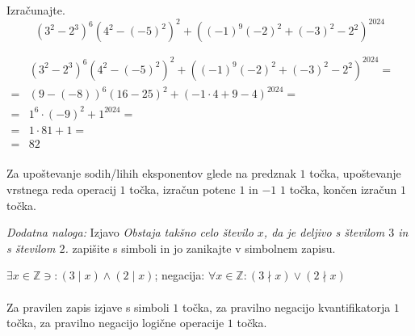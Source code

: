 \documentclass[addpoints]{exam}
\begin{document}
\begin{questions}
        

    \question[4]
    Izračunajte. $$ \left(3^2-2^3\right)^6\left(4^2-(-5)^2\right)^2+\left((-1)^9(-2)^2+(-3)^2-2^2\right)^{2024}$$
    \begin{solution}[5cm]
            $\begin{aligned}
                &(3^2-2^3)^6(4^2-(-5)^2)^2+((-1)^9(-2)^2+(-3)^2-2^2)^{2024}= \\
                    =& (9-(-8))^6(16-25)^2+(-1\cdot 4+9-4)^{2024}=\\
                    =& 1^6\cdot(-9)^2+1^{2024}= \\
                    =& 1\cdot 81+1= \\
                    =& 82
            \end{aligned} $ \\ \\
            Za upoštevanje sodih/lihih eksponentov glede na predznak $1$ točka, upoštevanje vrstnega reda operacij $1$ točka, izračun potenc $1$ in $-1$ $1$ točka, končen izračun $1$ točka.
    \end{solution}

    
    \bonusquestion[3]
    \textit{Dodatna naloga:} Izjavo \textit{Obstaja takšno celo število $x$, da je deljivo s številom $3$ in s številom $2$.} zapišite s simboli in jo zanikajte v simbolnem zapisu.

    \begin{solution}
        $\exists x\in\mathbb{Z}\ni:(3\mid x)\land(2\mid x)$; negacija: $\forall x\in\mathbb{Z}: (3\nmid x)\lor(2\nmid x)$ \\ \\
        Za pravilen zapis izjave s simboli $1$ točka, za pravilno negacijo kvantifikatorja $1$ točka, za pravilno negacijo logične operacije $1$ točka.
    \end{solution}


\end{questions}
\end{document}
